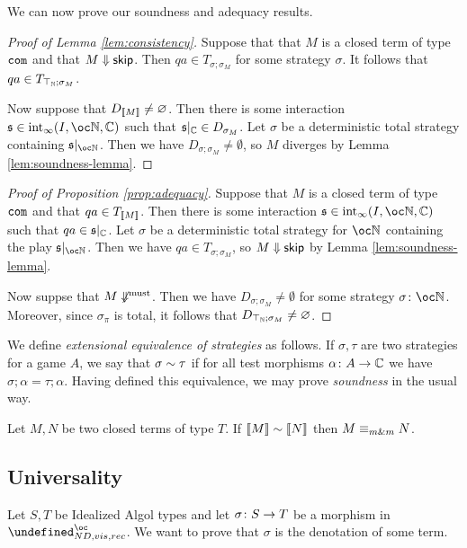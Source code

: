 \documentclass[sigplan,10pt,review]{acmart}\settopmatter{printfolios=true,printccs=false,printacmref=false}
\let\G\undefined
\begin{document}
We can now prove our soundness and adequacy results.

\begin{proof}[Proof of Lemma \ref{lem:consistency}]
  Suppose that that $M$ is a closed term of type ${\mathtt{com}}$ and that $M\Downarrow{\mathsf{skip}}$.  
  Then $qa\in T_{\sigma;\sigma_M}$ for some strategy $\sigma$.  
  It follows that $qa\in T_{\top_{\mathbb{N}};\sigma_M}$.

  Now suppose that $D_{\left\llbracket M\right\rrbracket}\neq\varnothing$.  
  Then there is some interaction $\s\in\Int_\infty(I,\oc\bN,\bC)$ such that $\mathfrak s\vert_{\mathbb{C}}\in D_{\sigma_M}$.
  Let $\sigma$ be a deterministic total strategy containing $\s\vert_{\oc\bN}$.  
  Then we have $D_{\sigma;\sigma_M}\ne\emptyset$, so $M$ diverges by Lemma \ref{lem:soundness-lemma}.
\end{proof}

\begin{proof}[Proof of Proposition \ref{prop:adequacy}]
  Suppose that $M$ is a closed term of type ${\mathtt{com}}$ and that $qa\in T_{\left\llbracket M\right\rrbracket}$.  
  Then there is some interaction $\s\in\Int_\infty(I,\oc\bN,\bC)$ such that $qa\in\mathfrak s\vert_{\mathbb{C}}$.  
  Let $\sigma$ be a deterministic total strategy for $\oc\bN$ containing the play $\s\vert_{\oc\bN}$.  
  Then we have $qa\in T_{\sigma;\sigma_M}$, so $M\Downarrow{\mathsf{skip}}$ by Lemma \ref{lem:soundness-lemma}.

  Now suppse that $M\not\Downarrow^{\text{must}}$.  
  Then we have $D_{\sigma;\sigma_M}\ne\emptyset$ for some strategy $\sigma\from\oc\bN$.
  Moreover, since $\sigma_\pi$ is total, it follows that $D_{\top_{\mathbb{N}};\sigma_M}\ne\varnothing$.
\end{proof}

We define \emph{extensional equivalence of strategies} as follows.  
If $\sigma,\tau$ are two strategies for a game $A$, we say that $\sigma\sim\tau$ if for all test morphisms $\alpha\colon A \to \mathbb{C}$ we have $\sigma;\alpha=\tau;\alpha$.  
Having defined this equivalence, we may prove \emph{soundness} in the usual way.

\begin{theorem}[Soundness]
  Let $M,N$ be two closed terms of type $T$.  
  If $\left\llbracket M\right\rrbracket\sim\left\llbracket N\right\rrbracket$ then $M\equiv_{m\&m} N$.  
\end{theorem}

\subsection{Universality}

Let $S,T$ be Idealized Algol types and let $\sigma\colon S\to T$ be a morphism in $\G_{ND,vis,rec}^\oc$.  
We want to prove that $\sigma$ is the denotation of some term.  
\end{document}
